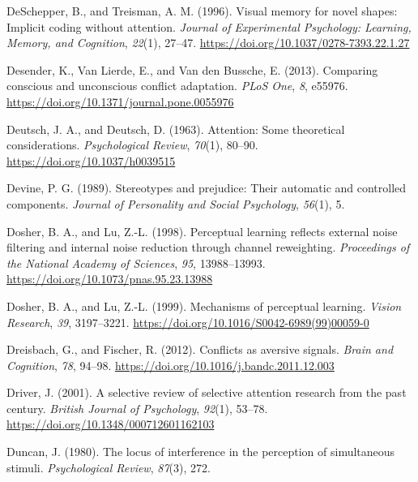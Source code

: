 \documentclass[]{DissertateCUNY}
\begin{document}
\leavevmode\hypertarget{ref-deschepper_visual_1996}{}%
DeSchepper, B., and Treisman, A. M. (1996). Visual memory for novel
shapes: Implicit coding without attention. \emph{Journal of Experimental
Psychology: Learning, Memory, and Cognition}, \emph{22}(1), 27--47.
\url{https://doi.org/10.1037/0278-7393.22.1.27}

\leavevmode\hypertarget{ref-desender_comparing_2013}{}%
Desender, K., Van Lierde, E., and Van den Bussche, E. (2013). Comparing
conscious and unconscious conflict adaptation. \emph{PLoS One},
\emph{8}, e55976. \url{https://doi.org/10.1371/journal.pone.0055976}

\leavevmode\hypertarget{ref-deutsch_attention_1963}{}%
Deutsch, J. A., and Deutsch, D. (1963). Attention: Some theoretical
considerations. \emph{Psychological Review}, \emph{70}(1), 80--90.
\url{https://doi.org/10.1037/h0039515}

\leavevmode\hypertarget{ref-devine_stereotypes_1989}{}%
Devine, P. G. (1989). Stereotypes and prejudice: Their automatic and
controlled components. \emph{Journal of Personality and Social
Psychology}, \emph{56}(1), 5.

\leavevmode\hypertarget{ref-dosher_perceptual_1998}{}%
Dosher, B. A., and Lu, Z.-L. (1998). Perceptual learning reflects
external noise filtering and internal noise reduction through channel
reweighting. \emph{Proceedings of the National Academy of Sciences},
\emph{95}, 13988--13993. \url{https://doi.org/10.1073/pnas.95.23.13988}

\leavevmode\hypertarget{ref-dosher_mechanisms_1999}{}%
Dosher, B. A., and Lu, Z.-L. (1999). Mechanisms of perceptual learning.
\emph{Vision Research}, \emph{39}, 3197--3221.
\url{https://doi.org/10.1016/S0042-6989(99)00059-0}

\leavevmode\hypertarget{ref-dreisbach_conflicts_2012}{}%
Dreisbach, G., and Fischer, R. (2012). Conflicts as aversive signals.
\emph{Brain and Cognition}, \emph{78}, 94--98.
\url{https://doi.org/10.1016/j.bandc.2011.12.003}

\leavevmode\hypertarget{ref-driver_selective_2001}{}%
Driver, J. (2001). A selective review of selective attention research
from the past century. \emph{British Journal of Psychology},
\emph{92}(1), 53--78. \url{https://doi.org/10.1348/000712601162103}

\leavevmode\hypertarget{ref-duncan_locus_1980}{}%
Duncan, J. (1980). The locus of interference in the perception of
simultaneous stimuli. \emph{Psychological Review}, \emph{87}(3), 272.
\end{document}
